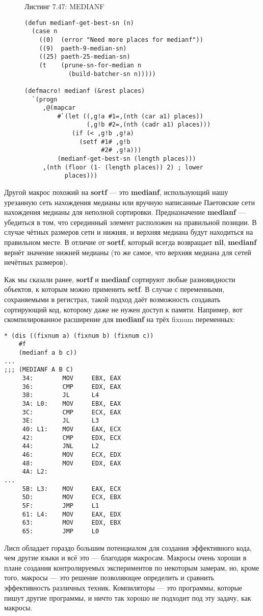 \begin{figure}Листинг 7.47: MEDIANF\label{listing_7.47}
\listbegin
\begin{verbatim}
(defun medianf-get-best-sn (n)
  (case n
    ((0)  (error "Need more places for medianf"))
    ((9)  paeth-9-median-sn)
    ((25) paeth-25-median-sn)
    (t    (prune-sn-for-median n
            (build-batcher-sn n)))))

(defmacro! medianf (&rest places)
  `(progn
     ,@(mapcar
         #`(let ((,g!a #1=,(nth (car a1) places))
                 (,g!b #2=,(nth (cadr a1) places)))
             (if (< ,g!b ,g!a)
               (setf #1# ,g!b
                     #2# ,g!a)))
         (medianf-get-best-sn (length places)))
     ,(nth (floor (1- (length places)) 2) ; lower
           places)))
\end{verbatim}
\listend
\end{figure}

Другой макрос похожий на \textbf{sortf} --- это \textbf{medianf}, использующий нашу урезанную сеть нахождения медианы или вручную написанные Паетовские сети нахождения медианы для неполной сортировки. Предназначение \textbf{medianf} --- убедиться в том, что серединный элемент расположен на правильной позиции. В случае чётных размеров сети и нижняя, и верхняя медиана будут находиться на правильном месте. В отличие от \textbf{sortf}, который всегда возвращает \textbf{nil}, \textbf{medianf} вернёт значение нижней медианы (то же самое, что верхняя медиана для сетей нечётных размеров).

Как мы сказали ранее, \textbf{sortf} и \textbf{medianf} сортируют любые разновидности объектов, к которым можно применить \textbf{setf}. В случае с переменными, сохраняемыми в регистрах, такой подход даёт возможность создавать сортирующий код, которому даже не нужен доступ к памяти. Например, вот скомпилированное расширение для \textbf{medianf} на трёх fixnum переменных:

\begin{verbatim}
* (dis ((fixnum a) (fixnum b) (fixnum c))
    #f
    (medianf a b c))
...
;;; (MEDIANF A B C)
     34:        MOV     EBX, EAX
     36:        CMP     EDX, EAX
     38:        JL      L4
     3A: L0:    MOV     EBX, EAX
     3C:        CMP     ECX, EAX
     3E:        JL      L3
     40: L1:    MOV     EAX, ECX
     42:        CMP     EDX, ECX
     44:        JNL     L2
     46:        MOV     ECX, EDX
     48:        MOV     EDX, EAX
     4A: L2:
...
     5B: L3:    MOV     EAX, ECX
     5D:        MOV     ECX, EBX
     5F:        JMP     L1
     61: L4:    MOV     EAX, EDX
     63:        MOV     EDX, EBX
     65:        JMP     L0 
\end{verbatim}

Лисп обладает гораздо большим потенциалом для создания эффективного кода, чем другие языки и всё это --- благодаря макросам. Макросы очень хороши в плане создания контролируемых экспериментов по некоторым замерам, но, кроме того, макросы --- это решение позволяющее определить и сравнить эффективность различных техник. Компиляторы --- это программы, которые пишут другие программы, и ничто так хорошо не подходит под эту задачу, как макросы.

